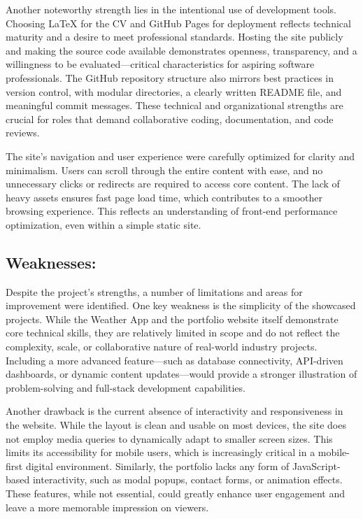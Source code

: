 \documentclass[11pt,a4paper]{article}
\begin{document}
Another noteworthy strength lies in the intentional use of development tools. Choosing LaTeX for the CV and GitHub Pages for deployment reflects technical maturity and a desire to meet professional standards. Hosting the site publicly and making the source code available demonstrates openness, transparency, and a willingness to be evaluated—critical characteristics for aspiring software professionals. The GitHub repository structure also mirrors best practices in version control, with modular directories, a clearly written README file, and meaningful commit messages. These technical and organizational strengths are crucial for roles that demand collaborative coding, documentation, and code reviews.

The site’s navigation and user experience were carefully optimized for clarity and minimalism. Users can scroll through the entire content with ease, and no unnecessary clicks or redirects are required to access core content. The lack of heavy assets ensures fast page load time, which contributes to a smoother browsing experience. This reflects an understanding of front-end performance optimization, even within a simple static site.

\subsection*{Weaknesses:}

Despite the project’s strengths, a number of limitations and areas for improvement were identified. One key weakness is the simplicity of the showcased projects. While the Weather App and the portfolio website itself demonstrate core technical skills, they are relatively limited in scope and do not reflect the complexity, scale, or collaborative nature of real-world industry projects. Including a more advanced feature—such as database connectivity, API-driven dashboards, or dynamic content updates—would provide a stronger illustration of problem-solving and full-stack development capabilities.

Another drawback is the current absence of interactivity and responsiveness in the website. While the layout is clean and usable on most devices, the site does not employ media queries to dynamically adapt to smaller screen sizes. This limits its accessibility for mobile users, which is increasingly critical in a mobile-first digital environment. Similarly, the portfolio lacks any form of JavaScript-based interactivity, such as modal popups, contact forms, or animation effects. These features, while not essential, could greatly enhance user engagement and leave a more memorable impression on viewers.
\end{document}
